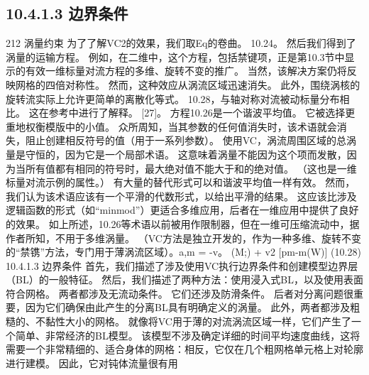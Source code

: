 \documentclass[UTF8,11pt,a4paper,openany,fontset=fandol]{ctexbook}
\begin{document}
\subsection{10.4.1.3 边界条件}
212 涡量约束 为了了解VC2的效果，我们取Eq的卷曲。 10.24。 然后我们得到了涡量的运输方程。 例如，在二维中，这个方程，包括禁键项，正是第10.3节中显示的有效一维标量对流方程的多维、旋转不变的推广。 当然，该解决方案仍将反映网格的四倍对称性。 然而，这种效应从涡流区域迅速消失。 此外，围绕涡核的旋转流实际上允许更简单的离散化等式。 10.28，与轴对称对流被动标量分布相比。 这在参考中进行了解释。 [27]。 方程10.26是一个谐波平均值。 它被选择更重地权衡模版中的小值。 众所周知，当其参数的任何值消失时，该术语就会消失，阻止创建相反符号的值（用于一系列参数）。 使用VC，涡流周围区域的总涡量是守恒的，因为它是一个局部术语。 这意味着涡量不能因为这个项而发散，因为当所有值都有相同的符号时，最大绝对值不能大于和的绝对值。 （这也是一维标量对流示例的属性。） 有大量的替代形式可以和谐波平均值一样有效。 然而，我们认为该术语应该有一个平滑的代数形式，以给出平滑的结果。 这应该比涉及逻辑函数的形式（如“minmod”）更适合多维应用，后者在一维应用中提供了良好的效果。 如上所述，10.26等术语以前被用作限制器，但在一维可压缩流动中，据作者所知，不用于多维涡量。 （VC方法是独立开发的，作为一种多维、旋转不变的“禁镌”方法，专门用于薄涡流区域）。a,m = -v。 (M;) + v2 [pm-m(W)] (10.28) 10.4.1.3 边界条件 首先，我们描述了涉及使用VC执行边界条件和创建模型边界层（BL）的一般特征。 然后，我们描述了两种方法：使用浸入式BL，以及使用表面符合网格。 两者都涉及无流动条件。 它们还涉及防滑条件。 后者对分离问题很重要，因为它们确保由此产生的分离BL具有明确定义的涡量。 此外，两者都涉及粗糙的、不黏性大小的网格。 就像将VC用于薄的对流涡流区域一样，它们产生了一个简单、非常经济的BL模型。 该模型不涉及确定详细的时间平均速度曲线，这将需要一个非常精细的、适合身体的网格：相反，它仅在几个粗网格单元格上对轮廓进行建模。 因此，它对钝体流量很有用
\end{document}
